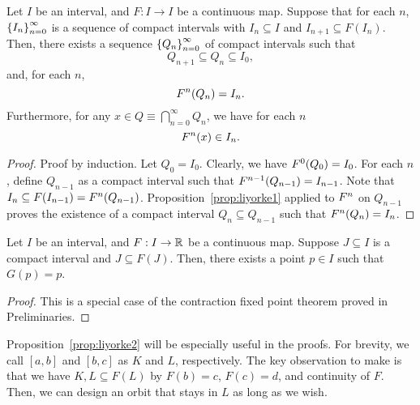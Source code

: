 \documentclass[10pt,draft,twoside]{book}
\begin{document}
\begin{proposition}
  Let $I$ be an interval, and $F: I\to I$ be a continuous map.
  Suppose that for each $n$, $\left \{ I_n \right \}^{\infty}_{n=0}$ is a sequence of compact intervals with $I_n \subseteq I$ and $I_{n+1} \subseteq F(I_n)$.
  Then, there exists a sequence $\left \{ Q_n \right \}^{\infty}_{n=0}$ of compact intervals such that 
\begin{equation*}
    Q_{n+1} \subseteq Q_{n} \subseteq I_0,
  \end{equation*}
and, for each $n$,
  \begin{equation*}
    F^{n}(Q_n) = I_n.
  \end{equation*}
  Furthermore, for any $x \in Q \equiv \bigcap\limits_{n=0}^{\infty}Q_n$, we have for each $n$
  \begin{equation*}
    F^{n}(x) \in I_n.
  \end{equation*}
  \label{prop:liyorke2}
  \begin{proof}
    Proof by induction.
    Let $Q_0 = I_0$.
    Clearly, we have $F^{0}(Q_0) = I_0$.
    For each $n$, define $Q_{n-1}$ as a compact interval such that $F^{n-1}(Q_{n-1}) = I_{n-1}$.
    Note that $I_n \subseteq F(I_{n-1}) = F^{n}(Q_{n-1})$.
    Proposition~\ref{prop:liyorke1} applied to $F^{n}$ on $Q_{n-1}$ proves the existence of a compact interval $Q_n \subseteq Q_{n-1}$ such that $F^{n}(Q_n) = I_n$.
  \end{proof}
\end{proposition}
\begin{proposition}
  Let $I$ be an interval, and $F: I\to \mathbb{R}$ be a continuous map.
  Suppose $J \subseteq I$ is a compact interval and $J \subseteq F(J)$. 
  Then, there exists a point $p \in I$ such that $G(p) = p$.
  \begin{proof}
    This is a special case of the contraction fixed point theorem proved in Preliminaries.
  \end{proof}
  \label{prop:liyorke3}
\end{proposition}
Proposition~\ref{prop:liyorke2} will be especially useful in the proofs.
For brevity, we call $[a,b]$ and $[b,c]$ as $K$ and $L$, respectively.
The key observation to make is that we have $K,L \subseteq F(L)$ by $F(b) = c$, $F(c) = d$, and continuity of $F$.
Then, we can design an orbit that stays in $L$ as long as we wish.
\end{document}
